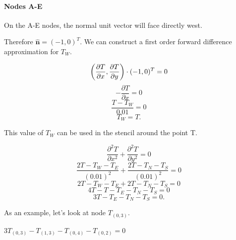\documentclass[12pt,a4paper]{article}
\begin{document}
\paragraph*{Nodes A-E}
On the A-E nodes, the normal unit vector will face directly west.
\begin{center}
\end{center}
Therefore $\hat{\textbf{n}} = (-1,0)^T$. We can construct a first order forward difference approximation for $T_W$.
\begin{center}
\[\bigg{(}\frac{\partial T}{\partial x},\frac{\partial T}{\partial y}\bigg{)}\cdot (-1,0)^T = 0\]
\[-\frac{\partial T}{\partial x} = 0\]
\[\frac{T-T_W}{0.01} = 0\]
\[T_W = T.\]
\end{center}
This value of $T_W$ can be used in the stencil around the point T.
\begin{center}
\[\frac{\partial^2 T}{\partial x^2}+\frac{\partial^2 T}{\partial y^2}=0\]
\[\frac{2T-T_W-T_E}{(0.01)^2}+\frac{2T-T_N-T_S}{(0.01)^2}=0\]
\[2T-T_W-T_E+2T-T_N-T_S=0\]
\[4T-T-T_E-T_N-T_S=0\]
\[3T-T_E-T_N-T_S=0.\]
\end{center}

As an example, let's look at node $T_{(0, 3)}$. 
\begin{center}
  $3T_{(0,3)}-T_{(1,3)}-T_{(0,4)}-T_{(0,2)}=0$
\end{center}
\end{document}
